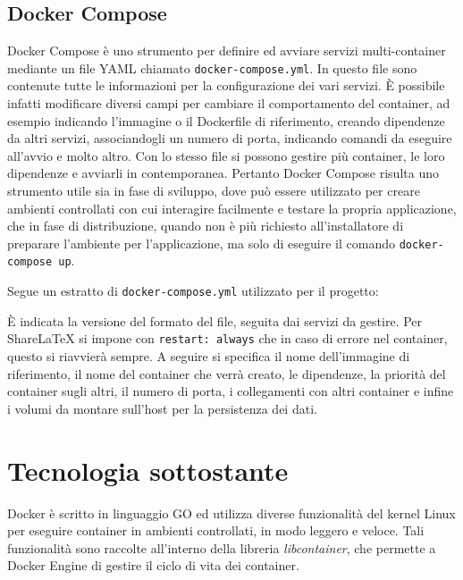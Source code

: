 \subsection{Docker Compose}
Docker Compose è uno strumento per definire ed avviare servizi multi-container mediante un file YAML chiamato \verb|docker-compose.yml|. In questo file sono contenute tutte le informazioni per la configurazione dei vari servizi. È possibile infatti modificare diversi campi per cambiare il comportamento del container, ad esempio indicando l'immagine o il Dockerfile di riferimento, creando dipendenze da altri servizi, associandogli un numero di porta, indicando comandi da eseguire all'avvio e molto altro. Con lo stesso file si possono gestire più container, le loro dipendenze e avviarli in contemporanea. Pertanto Docker Compose risulta uno strumento utile sia in fase di sviluppo, dove può essere utilizzato per creare ambienti controllati con cui interagire facilmente e testare la propria applicazione, che in fase di distribuzione, quando non è più richiesto all'installatore di preparare l'ambiente per l'applicazione, ma solo di eseguire il comando \verb|docker-compose up|.

Segue un estratto di \verb|docker-compose.yml| utilizzato per il progetto:

È indicata la versione del formato del file, seguita dai servizi da gestire. Per ShareLaTeX si impone con \verb|restart: always| che in caso di errore nel container, questo si riavvierà sempre. A seguire si specifica il nome dell'immagine di riferimento, il nome del container che verrà creato, le dipendenze, la priorità del container sugli altri, il numero di porta, i collegamenti con altri container e infine i volumi da montare sull'host per la persistenza dei dati.
 
\section{Tecnologia sottostante}
Docker è scritto in linguaggio GO ed utilizza diverse funzionalità del kernel Linux per eseguire container in ambienti controllati, in modo leggero e veloce. Tali funzionalità sono raccolte all'interno della libreria \emph{libcontainer}, che permette a Docker Engine di gestire il ciclo di vita dei container.

